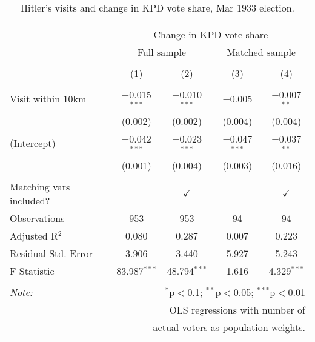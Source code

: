 
\begin{table}[!htbp] \centering 
  \caption{Hitler's visits and change in KPD vote share, Mar 1933 election.} 
  \label{tab:ols-d_p_kpd-4} 
\begin{tabular}{@{\extracolsep{5pt}}lcccc} 
\\[-1.8ex]\hline 
\hline \\[-1.8ex] 
 & \multicolumn{4}{c}{Change in KPD vote share} \\ 
\cline{2-5} 
 & \multicolumn{2}{c}{Full sample} & \multicolumn{2}{c}{Matched sample} \\ 
\\[-1.8ex] & (1) & (2) & (3) & (4)\\ 
\hline \\[-1.8ex] 
 Visit within 10km & $-$0.015$^{***}$ & $-$0.010$^{***}$ & $-$0.005 & $-$0.007$^{**}$ \\ 
  & (0.002) & (0.002) & (0.004) & (0.004) \\ 
  (Intercept) & $-$0.042$^{***}$ & $-$0.023$^{***}$ & $-$0.047$^{***}$ & $-$0.037$^{**}$ \\ 
  & (0.001) & (0.004) & (0.003) & (0.016) \\ 
 \hline \\[-1.8ex] 
Matching vars included? &  & \multicolumn{1}{c}{$\checkmark$} &  & \multicolumn{1}{c}{$\checkmark$} \\ 
Observations & 953 & 953 & 94 & 94 \\ 
Adjusted R$^{2}$ & 0.080 & 0.287 & 0.007 & 0.223 \\ 
Residual Std. Error & 3.906 & 3.440 & 5.927 & 5.243 \\ 
F Statistic & 83.987$^{***}$ & 48.794$^{***}$ & 1.616 & 4.329$^{***}$ \\ 
\hline 
\hline \\[-1.8ex] 
\textit{Note:}  & \multicolumn{4}{r}{$^{*}$p$<$0.1; $^{**}$p$<$0.05; $^{***}$p$<$0.01} \\ 
 & \multicolumn{4}{r}{OLS regressions with number of} \\ 
 & \multicolumn{4}{r}{actual voters as population weights.} \\ 
\end{tabular} 
\end{table} 
